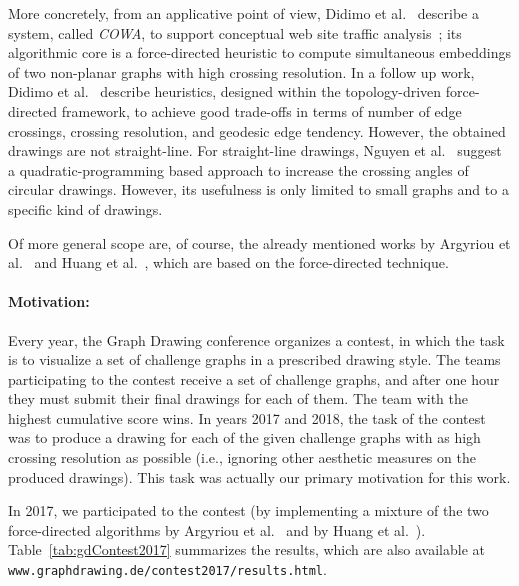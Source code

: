 \documentclass{comjnl}
\newcommand{\myparagraph}[1]{\medskip\noindent\textbf{#1}.}
\begin{document}
More concretely, from an applicative point of view, Didimo et al.~\cite{DBLP:conf/apvis/DidimoLR10} describe a system, called \emph{COWA},  to support conceptual web site traffic analysis~\cite{DBLP:conf/apvis/DidimoLR10}; its algorithmic core is a force-directed heuristic to compute simultaneous embeddings of two non-planar graphs with high crossing resolution.
%
In a follow up work, Didimo et al.~\cite{DBLP:conf/gd/DidimoLR10} describe heuristics, designed within the topology-driven force-directed framework, to achieve good trade-offs in terms of number of edge crossings, crossing resolution, and geodesic edge tendency.
%
However, the obtained drawings are not straight-line. For straight-line drawings, Nguyen et al.~\cite{DBLP:conf/gd/NguyenEHH10} suggest a quadratic-programming based approach to increase the crossing angles of circular drawings. However, its usefulness is only limited to small graphs and to a specific kind of drawings.

Of more general scope are, of course, the already mentioned works by Argyriou et al.~\cite{DBLP:journals/cj/ArgyriouBS13} and Huang et al.~\cite{DBLP:journals/vlc/HuangEHL13}, which are based on the force-directed technique.



\paragraph{Motivation:}


Every year, the Graph Drawing conference organizes a contest, in which the task is to visualize a set of challenge graphs in a prescribed drawing style. The teams participating to the contest receive a set of challenge graphs, and after one hour they must submit their final drawings for each of them. The team with the highest cumulative score wins. 
%
In years 2017 and 2018, the task of the contest was to produce a drawing for each of the given challenge graphs with as high crossing resolution as possible (i.e., ignoring other aesthetic measures on the produced drawings). This task was actually our primary motivation for this work. 

In 2017, we participated to the contest (by implementing a mixture of the two force-directed algorithms by Argyriou et al.~\cite{DBLP:journals/cj/ArgyriouBS13} and by Huang et al.~\cite{DBLP:journals/vlc/HuangEHL13}). 
%
Table~\ref{tab:gdContest2017} summarizes the results, which are also available at \texttt{www.graphdrawing.de/contest2017/results.html}. 
\end{document}
